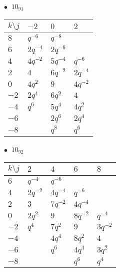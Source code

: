 %
\begin{minipage}{\linewidth}
$\bullet\ $ $10_{91}$ \vspace{0.5em} \\
\begin{tabular}{l|lll}
$k \setminus j$ & $-2$ & $0$ & $2$ \\
\hline
$8$ & $q^{-6}$ & $q^{-8}$ &  \\
$6$ & $2q^{-4}$ & $2q^{-6}$ &  \\
$4$ & $4q^{-2}$ & $5q^{-4}$ & $q^{-6}$ \\
$2$ & $4$ & $6q^{-2}$ & $2q^{-4}$ \\
$0$ & $4q^{2}$ & $9$ & $4q^{-2}$ \\
$-2$ & $2q^{4}$ & $6q^{2}$ & $4$ \\
$-4$ & $q^{6}$ & $5q^{4}$ & $4q^{2}$ \\
$-6$ &  & $2q^{6}$ & $2q^{4}$ \\
$-8$ &  & $q^{8}$ & $q^{6}$ \\
\end{tabular}
\vspace{2em}
\end{minipage}
%
\begin{minipage}{\linewidth}
$\bullet\ $ $10_{92}$ \vspace{0.5em} \\
\begin{tabular}{l|llll}
$k \setminus j$ & $2$ & $4$ & $6$ & $8$ \\
\hline
$6$ & $q^{-4}$ & $q^{-6}$ &  &  \\
$4$ & $2q^{-2}$ & $4q^{-4}$ & $q^{-6}$ &  \\
$2$ & $3$ & $7q^{-2}$ & $4q^{-4}$ &  \\
$0$ & $2q^{2}$ & $9$ & $8q^{-2}$ & $q^{-4}$ \\
$-2$ & $q^{4}$ & $7q^{2}$ & $9$ & $3q^{-2}$ \\
$-4$ &  & $4q^{4}$ & $8q^{2}$ & $4$ \\
$-6$ &  & $q^{6}$ & $4q^{4}$ & $3q^{2}$ \\
$-8$ &  &  & $q^{6}$ & $q^{4}$ \\
\end{tabular}
\vspace{2em}
\end{minipage}
%
